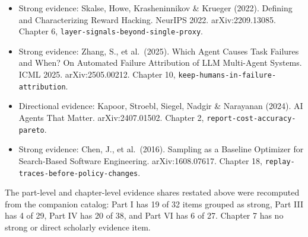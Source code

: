 \begin{itemize}
\tightlist
\item
  Strong evidence: Skalse, Howe, Krasheninnikov \& Krueger (2022). Defining and Characterizing Reward Hacking. NeurIPS 2022. arXiv:2209.13085. Chapter 6, \texttt{layer-signals-beyond-single-proxy}.
\item
  Strong evidence: Zhang, S., et al.~(2025). Which Agent Causes Task Failures and When? On Automated Failure Attribution of LLM Multi-Agent Systems. ICML 2025. arXiv:2505.00212. Chapter 10, \texttt{keep-humans-in-failure-attribution}.
\item
  Directional evidence: Kapoor, Stroebl, Siegel, Nadgir \& Narayanan (2024). AI Agents That Matter. arXiv:2407.01502. Chapter 2, \texttt{report-cost-accuracy-pareto}.
\item
  Strong evidence: Chen, J., et al.~(2016). Sampling as a Baseline Optimizer for Search-Based Software Engineering. arXiv:1608.07617. Chapter 18, \texttt{replay-traces-before-policy-changes}.
\end{itemize}

The part-level and chapter-level evidence shares restated above were recomputed from the companion catalog: Part I has 19 of 32 items grouped as strong, Part III has 4 of 29, Part IV has 20 of 38, and Part VI has 6 of 27. Chapter 7 has no strong or direct scholarly evidence item.
